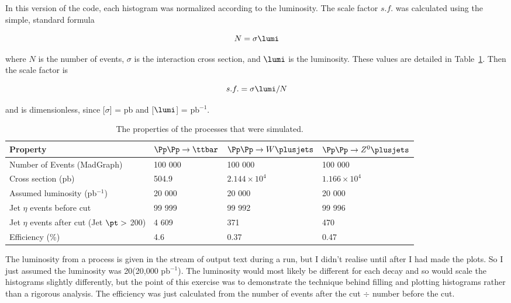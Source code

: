 In this version of the code, each histogram was normalized according to the luminosity. The scale factor $s.f.$ was calculated using the simple, standard formula

\begin{equation}
\label{eq:lumiexpev}
N = \sigma \lumi
\end{equation}

where $N$ is the number of events, $\sigma$ is the interaction cross section, and $\lumi$ is the luminosity. These values are detailed in Table~\ref{tab:comparison}. Then the scale factor is

\begin{equation}
s.f. = \sigma \lumi / N
\end{equation}

and is dimensionless, since [$\sigma$] = pb and [$\lumi$] = pb$^{-1}$.

\begin{table}[htbp]
\centering
    \begin{tabular}{|l|l|l|l|}
    \hline
    Property                                & $\Pp\Pp \rightarrow \ttbar$ & $\Pp\Pp \rightarrow W \plusjets$ & $\Pp\Pp \rightarrow Z^0 \plusjets$ \\ \hline
    Number of Events (MadGraph)             & 100 000 & 100 000 & 100 000 \\
    Cross section (pb)                      & 504.9   & $2.144\times10^4$ & $1.166\times10^4$ \\
    Assumed luminosity (pb$^{-1}$)		& 20 000	& 20 000 & 20 000 \\
    Jet $\eta$ events before cut               & 99 999  & 99 992  & 99 996  \\
    Jet $\eta$  events after cut (Jet $\pt >$ 200) & 4 609    & 371     & 470     \\
    Efficiency (\%)                         & 4.6     & 0.37    & 0.47    \\ \hline
    \end{tabular}
\caption{The properties of the \madgraph processes that were simulated.}
\label{tab:comparison}
\end{table}

The luminosity from a process is given in the stream of output text during a \madgraph run, but I didn't realise until after I had made the plots. So I just assumed the luminosity was 20\fbinv (20,000 pb$^{-1}$). The luminosity would most likely be different for each decay and so would scale the histograms slightly differently, but the point of this exercise was to demonstrate the technique behind filling and plotting histograms rather than a rigorous analysis. The efficiency was just calculated from the number of events after the cut $\div$ number before the cut.

